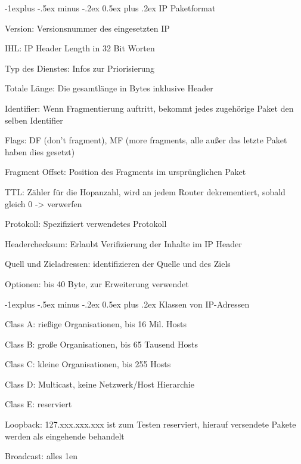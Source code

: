 \documentclass[10pt,landscape]{article}
\makeatletter
\renewcommand{\subsection}{\@startsection{subsection}{2}{0mm}%
                                {-1explus -.5ex minus -.2ex}%
                                {0.5ex plus .2ex}%
                                {\normalfont\normalsize\bfseries}}
\makeatother
\begin{document}
\begin{multicols}{3}
    \subsection{IP Paketformat}
    \begin{itemize*}
        \item Version: Versionsnummer des eingesetzten IP
        \item IHL: IP Header Length in 32 Bit Worten
        \item Typ des Dienstes: Infos zur Priorisierung
        \item Totale Länge: Die gesamtlänge in Bytes inklusive Header
        \item Identifier: Wenn Fragmentierung auftritt, bekommt jedes zugehörige Paket den selben Identifier
        \item Flags: DF (don't fragment), MF (more fragments, alle außer das letzte Paket haben dies gesetzt)
        \item Fragment Offset: Position des Fragments im ursprünglichen Paket
        \item TTL: Zähler für die Hopanzahl, wird an jedem Router dekrementiert, sobald gleich 0 -> verwerfen
        \item Protokoll: Spezifiziert verwendetes Protokoll
        \item Headerchecksum: Erlaubt Verifizierung der Inhalte im IP Header
        \item Quell und Zieladressen: identifizieren der Quelle und des Ziels
        \item Optionen: bis 40 Byte, zur Erweiterung verwendet
    \end{itemize*}
    
    \subsection{Klassen von IP-Adressen}
    \begin{itemize*}
        \item Class A: rießige Organisationen, bis 16 Mil. Hosts
        \item Class B: große Organisationen, bis 65 Tausend Hosts
        \item Class C: kleine Organisationen, bis 255 Hosts
        \item Class D: Multicast, keine Netzwerk/Host Hierarchie
        \item Class E: reserviert
        \item Loopback: 127.xxx.xxx.xxx ist zum Testen reserviert, hierauf versendete Pakete werden als eingehende behandelt
        \item Broadcast: alles 1en
    \end{itemize*}
    

\end{multicols}
\end{document}
